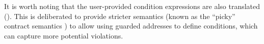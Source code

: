 It is worth noting that the user-provided condition expressions are also translated ().
This is deliberated to provide stricter semantics (known as the
``picky'' contract semantics \cite{DBLP:journals/jfp/BlumeM06}) to allow 
using guarded addresses to define conditions, which can capture more potential violations.

